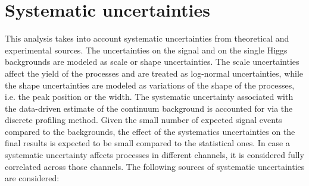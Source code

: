 \section{Systematic uncertainties} \label{section:Systematics}
This analysis takes into account systematic uncertainties from theoretical and experimental sources. The uncertainties on the signal and on the single Higgs backgrounds are modeled as scale or shape uncertainties. The scale uncertainties affect the yield of the processes and are treated as log-normal uncertainties, while the shape uncertainties are modeled as variations of the \mgg shape of the processes, i.e. the peak position or the width. The systematic uncertainty associated with the data-driven estimate of the continuum background is accounted for via the discrete profiling method. Given the small number of expected signal events compared to the backgrounds, the effect of the systematics uncertainties on the final results is expected to be small compared to the statistical ones. In case a systematic uncertainty affects processes in different channels, it is considered fully correlated across those channels. The following sources of systematic uncertainties are considered:

